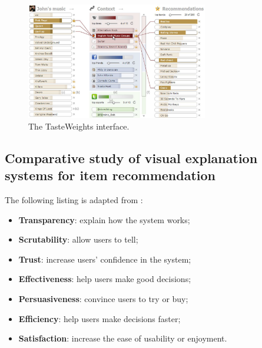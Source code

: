 \begin{figure}%
	\begin{center}
		\includegraphics[width=300px]{img/tasteweights}%
	\end{center}
	\caption{The TasteWeights interface.}%
	\label{figure:tasteweights}%
\end{figure}








\subsection{Comparative study of visual explanation systems for item recommendation}

The following listing is adapted from \cite{tintarev:2007:SER:1547550.1547664}:

\begin{itemize}
	\item \textbf{Transparency}: explain how the system works;
	\item \textbf{Scrutability}: allow users to tell;
	\item \textbf{Trust}: increase users' confidence in the system;
	\item \textbf{Effectiveness}: help users make good decisions;
	\item \textbf{Persuasiveness}: convince users to try or buy;
	\item \textbf{Efficiency}: help users make decisions faster;
	\item \textbf{Satisfaction}: increase the ease of usability or enjoyment.
\end{itemize}

